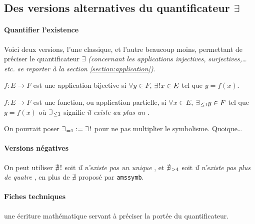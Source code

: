 \documentclass[12pt,a4paper]{article}
\newcommand\eqdef{:=}
\begin{document}

\subsection{\texorpdfstring{Des versions alternatives du quantificateur $\exists$}%
                           {Des versions alternatives du quantificateur existentiel}}
         
\paragraph{Quantifier l'existence}

Voici deux versions, l'une classique, et l'autre beaucoup moins, permettant de préciser le quantificateur $\exists$ \emph{(concernant les applications injectives, surjectives,\dots{} \emph{etc.} se reporter à la section \ref{section:application})}.

\begin{tcblisting}{}
$f: E \to F$ est une application bijective si $\forall y \in F$,
$\existsone x \in E$ tel que $y = f(x)$.

$f: E \to F$ est une fonction, ou application partielle, si $\forall x \in E$,
$\existmulti{\leq 1} y \in F$ tel que $y = f(x)$ où $\existmulti{\leq 1}$ signifie
\emph{\og il existe au plus un \fg}.

On pourrait poser $\existmulti{=1} \eqdef \existsone$ pour ne pas multiplier
le symbolisme. Quoique\dots
\end{tcblisting}



\paragraph{Versions négatives}

\begin{tcblisting}{}
On peut utiliser $\nexistsone$ soit \emph{\og il n'existe pas un unique \fg},
et $\nexistmulti{>4}$ soit \emph{\og il n'existe pas plus de quatre \fg}, en plus
de $\nexists$ proposé par \verb+amssymb+.
\end{tcblisting}



\paragraph{Fiches techniques}



 une écriture mathématique servant à préciser la portée du quantificateur.


\bigskip


\end{document}
